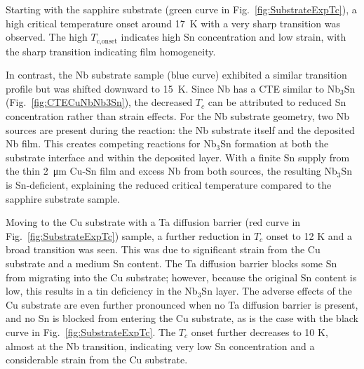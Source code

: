 
    Starting with the sapphire substrate (green curve in Fig.~\ref{fig:SubstrateExpTc}), a high critical temperature onset around 17~K with a very sharp transition was observed. The high $T_\text{c,onset}$ indicates high Sn concentration and low strain, with the sharp transition indicating film homogeneity. 

    In contrast, the Nb substrate sample (blue curve) exhibited a similar transition profile but was shifted downward to 15~K. Since Nb has a CTE similar to Nb$_3$Sn (Fig.~\ref{fig:CTECuNbNb3Sn}), the decreased $T_c$ can be attributed to reduced Sn concentration rather than strain effects. For the Nb substrate geometry, two Nb sources are present during the reaction: the Nb substrate itself and the deposited Nb film. This creates competing reactions for Nb$_3$Sn formation at both the substrate interface and within the deposited layer. With a finite Sn supply from the thin 2~\unit{\um} Cu-Sn film and excess Nb from both sources, the resulting Nb$_3$Sn is Sn-deficient, explaining the reduced critical temperature compared to the sapphire substrate sample.
    
    Moving to the Cu substrate with a Ta diffusion barrier (red curve in Fig.~\ref{fig:SubstrateExpTc}) sample, a further reduction in $T_c$ onset to 12 K and a broad transition was seen. This was due to significant strain from the Cu substrate and a medium Sn content. The Ta diffusion barrier blocks some Sn from migrating into the Cu substrate; however, because the original Sn content is low, this results in a tin deficiency in the Nb$_3$Sn layer. The adverse effects of the Cu substrate are even further pronounced when no Ta diffusion barrier is present, and no Sn is blocked from entering the Cu substrate, as is the case with the black curve in Fig.~\ref{fig:SubstrateExpTc}. The $T_c$ onset further decreases to 10 K, almost at the Nb transition, indicating very low Sn concentration and a considerable strain from the Cu substrate. 

